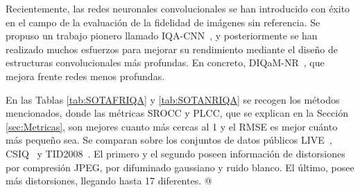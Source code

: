 Recientemente, las redes neuronales convolucionales se han introducido con 
éxito en el campo de la evaluación de la fidelidad de imágenes sin referencia. 
Se propuso un trabajo pionero llamado IQA-CNN~\cite{IQA-CNN}, 
y posteriormente se han realizado muchos esfuerzos para mejorar su rendimiento 
mediante el diseño de estructuras convolucionales más profundas. En concreto,
DIQaM-NR~\cite{DIQaM}, que mejora frente redes menos profundas.

En las Tablas \ref{tab:SOTAFRIQA} y \ref{tab:SOTANRIQA} se recogen los 
métodos mencionados, donde las métricas SROCC y PLCC, que se explican 
en la Sección \ref{sec:Metricas}, son mejores cuanto más cercas al 1 y 
el RMSE es mejor cuánto más pequeño sea.  Se comparan sobre los conjuntos de datos públicos
LIVE~\cite{LIVE, LIVE1, SSIM}, CSIQ~\cite{CSIQ} y TID2008~\cite{TID2008}. El primero y el segundo poseen información de distorsiones por compresión JPEG, por difuminado gaussiano y ruido blanco. El último, posee más distorsiones, llegando hasta 17 diferentes.
@
